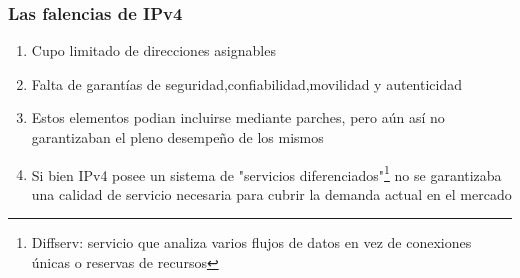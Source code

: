 \documentclass{beamer}
\begin{document}
%


\begin{frame}
\frametitle{Las falencias de IPv4}

\begin{enumerate}[$*$]

	\item Cupo limitado de direcciones asignables
	\item Falta de garant\'ias de seguridad,confiabilidad,movilidad y autenticidad
	\item Estos elementos podian incluirse mediante parches, pero a\'un as\'i no garantizaban el pleno desempeño de los mismos
	\item Si bien IPv4 posee un sistema de "servicios diferenciados"\footnote[1]{Diffserv: servicio que analiza varios flujos de datos en vez de conexiones únicas o reservas de recursos } no se garantizaba una calidad de servicio necesaria para cubrir la demanda actual en el mercado
\end{enumerate}



\end{frame}
\end{document}
